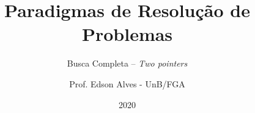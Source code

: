 \title{Paradigmas de Resolução de Problemas}
\subtitle{Busca Completa -- {\it Two pointers}}
\author{Prof. Edson Alves - UnB/FGA}
\date{2020}
